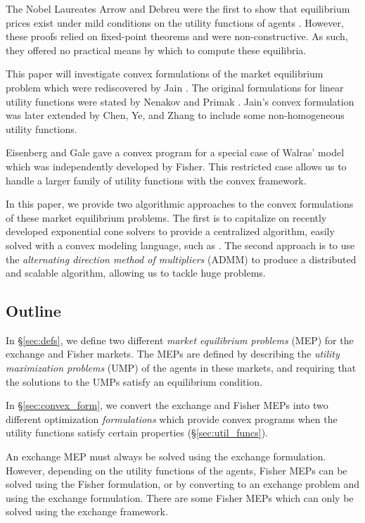 \documentclass[12pt]{article}
\begin{document}
The Nobel Laureates Arrow and Debreu were the first to show that equilibrium
prices exist under mild conditions on the utility functions of agents \cite{arrow1954existence}.
However, these proofs relied on fixed-point theorems and were non-constructive.
As such, they offered no practical means by which to compute these equilibria.

This paper will investigate convex formulations of the market
equilibrium problem which were rediscovered by Jain \cite{jain2007polynomial}.
The original formulations for linear utility functions
were stated by Nenakov and Primak \cite{nenakov1983algorithm}.
Jain's convex formulation was later extended by Chen, Ye, and Zhang \cite{chen2007note, chen2010equilibrium} to include some non-homogeneous
utility functions.

Eisenberg and Gale \cite{eisenberg1959consensus, gale1960theory, eisenberg1961aggregation} gave a convex program for a special case of Walras' model which was independently developed by Fisher. %
This restricted case allows us to handle a larger family of utility functions
with the convex framework.

In this paper, we provide two algorithmic approaches to the convex formulations of these market equilibrium problems. The first is to capitalize on recently developed exponential cone solvers \cite{scs} to provide a centralized algorithm, easily solved with a convex modeling language, such as \cite{cvxpy, cvx}. The second approach is to use the \emph{alternating direction method of multipliers} (ADMM) \cite{boyd2011distributed} to produce a distributed and scalable algorithm, allowing us to tackle huge problems.

\subsection{Outline}
In \S\ref{sec:defs}, we define two different \emph{market equilibrium problems} (MEP) for the exchange and Fisher markets.
The MEPs are defined by describing the \emph{utility maximization problems} (UMP) of the agents in these markets, and requiring that the solutions
to the UMPs satisfy an equilibrium condition.

In \S\ref{sec:convex_form}, we convert the exchange and Fisher MEPs into two different optimization \emph{formulations} which provide convex programs when the utility functions satisfy certain properties (\S\ref{sec:util_funcs}).

An exchange MEP must always be solved using the exchange formulation. However,
depending on the utility functions of the agents,
Fisher MEPs can be solved using the Fisher formulation, or by converting to an exchange problem and using the exchange formulation.
There are some Fisher MEPs which can only be solved using the exchange framework.
\end{document}
